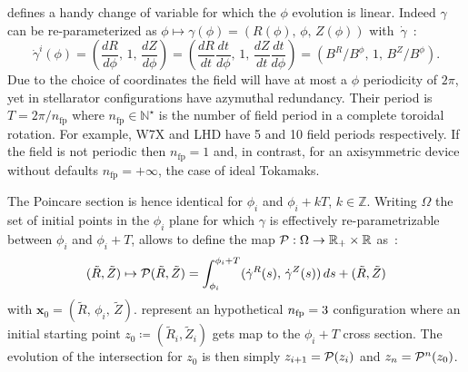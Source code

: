 defines a handy change of variable for which the $\phi$ evolution is linear. Indeed $\gamma$ can be re-parameterized as $\phi \mapsto \gamma(\phi) = (R(\phi),\,\phi,\,Z(\phi))$ with~$\dot{\gamma}$~:
\begin{equation*}
    \dot{\gamma}^i(\phi) = (\frac{dR}{d\phi},\,1,\,\frac{dZ}{d\phi}) = (\frac{dR}{dt}\frac{dt}{d\phi},\,1,\,\frac{dZ}{dt}\frac{dt}{d\phi}) = (B^R/B^\phi,\, 1,\,B^Z/B^\phi).
\end{equation*}
Due to the choice of coordinates the field will have at most a $\phi$ periodicity of $2\pi$, yet in stellarator configurations have azymuthal redundancy. Their period is $T = 2\pi/n_\text{fp}$ where $n_\text{fp}\in\mathbb{N}^\star$ is the number of field period in a complete toroidal rotation. For example, W7X and LHD have 5 and 10 field periods respectively. If the field is not periodic then $n_\text{fp} = 1$ and, in contrast, for an axisymmetric device without defaults $n_\text{fp} = +\infty$, the case of ideal Tokamaks.

The Poincare section is hence identical for $\phi_i$ and $\phi_i+kT$, $k\in\mathbb{Z}$. Writing $\Omega$ the set of initial points in the $\phi_i$ plane for which $\gamma$ is effectively re-parametrizable between $\phi_i$ and $\phi_i + T$, allows to define the map $\mathcal{P} : \Omega \rightarrow \mathbb{R}_+\times\mathbb{R}$ as~:
\begin{equation*}
    (\tilde{R},\tilde{Z}) \mapsto \mathcal{P}(\tilde{R},\tilde{Z}) = \int_{\phi_i}^{\phi_i+T}(
        \dot{\gamma}^R(s),\,
        \dot{\gamma}^Z(s)
    )\,ds + (\tilde{R},\tilde{Z})
\end{equation*}
with $\textbf{x}_0 = (\tilde{R},\,\phi_i,\,\tilde{Z})$.  represent an hypothetical $n_\text{fp} = 3$ configuration where an initial starting point $z_0\coloneqq (\tilde{R}_i,\tilde{Z}_i)$ gets map to the $\phi_i + T$ cross section. The evolution of the intersection for $z_0$ is then simply $z_{i+1} = \mathcal{P}(z_i)$ and $z_n = \mathcal{P}^n(z_0)$. 

